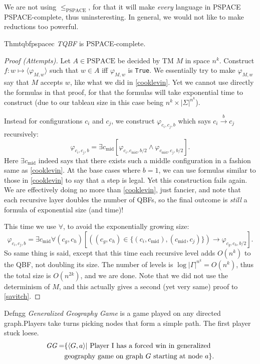 We are not using $\leq_{\mathrm{PSPACE}}$, for that it will make \textit{every} language in PSPACE PSPACE-complete, thus uninsteresting. In general, we would not like to make reductions too powerful.

\begin{reference}{Thm}{tqbfpspacec}
  \textit{TQBF} is {PSPACE-complete}.
\end{reference}

\begin{proof}[Proof (Attempts)]
  Let $A\in \mathrm{PSPACE}$ be decided by TM $M$ in space $n^k$. Construct $f:w\mapsto \langle \varphi_{M,w}\rangle$ such that $w\in A$ iff $\varphi_{M,w}$ is \texttt{True}. We essentially try to make $\varphi_{M,w}$ say that $M$ accepts $w$, like what we did in \ref{cooklevin}. Yet we cannot use directly the formulas in that proof, for that the formulas will take exponential time to construct (due to our tableau size in this case being $n^k\times |\Sigma|^{n^k}$).

  Instead for configurations $c_i$ and $c_j$, we construct $\varphi_{c_i,c_j,b}$ which says $c_i\xrightarrow{b}c_j$ recursively:
  \[
    \varphi_{c_i,c_j,b}=\exists c_{\text{mid}}\left[\varphi_{c_i,c_{\text{mid}},b/2}\wedge \varphi_{c_{\text{mid}},c_j,b/2}\right].
  \]
  Here $\exists c_{\text{mid}}$ indeed says that there exists such a middle configuration in a fashion same as \ref{cooklevin}. At the base cases where $b=1$, we can use formulas similar to those in \ref{cooklevin} to say that a step is legal. Yet this construction fails again. We are effectively doing no more than \ref{cooklevin}, just fancier, and note that each recursive layer doubles the number of QBFs, so the final outcome is \textit{still} a formula of exponential size (and time)!

  This time we use $\forall$, to avoid the exponentially growing size:
  \[
    \varphi_{c_i,c_j,b}=\exists c_{\text{mid}}\forall(c_g,c_h)\left[\left((c_g,c_h)\in\{(c_i,c_{\text{mid}}),(c_{\text{mid}},c_j)\}\right)\to\varphi_{c_g,c_h,b/2}\right].
  \]
  So same thing is said, except that this time each recursive level adds $O(n^k)$ to the QBF, not doubling its size. The number of levels is $\log |\Gamma|^{n^k}=O(n^k)$, thus the total size is $O(n^{2k})$, and we are done. Note that we did not use the determinism of $M$, and this actually gives a second (yet very same) proof to \ref{savitch}.
\end{proof}

\begin{reference}{Defn}{gg}
  \emph{Generalized Geography Game} is a game played on any directed graph.Players take turns picking nodes that form a simple path. The first player stuck loese.
  \begin{align*}
    \textit{GG}= & \{\langle G,a\rangle|\text{ Player I has a forced win in generalized} \\
                 & \text{geography game on graph }G\text{ starting at node }a\}.\qedhere
  \end{align*}
\end{reference}


